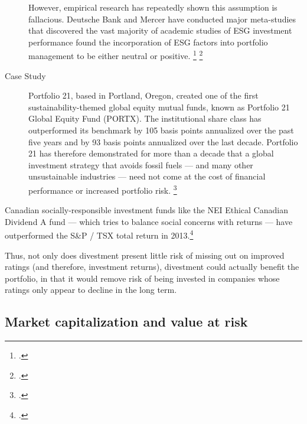 \begin{description}
  However, empirical research has repeatedly shown this assumption is fallacious.
  Deutsche Bank and Mercer have conducted major meta-studies that discovered the vast majority of academic studies of ESG investment performance found the incorporation of ESG factors into portfolio management to be either neutral or positive. \footcite{DeutscheBankSI} \footcite{MercerRI}
  \item[Case Study] Portfolio 21, based in Portland, Oregon, created one of the first sustainability-themed global equity mutual funds, known as Portfolio 21 Global Equity Fund (PORTX). The institutional share class has outperformed its benchmark by 105 basis points annualized over the past five years and by 93 basis points annualized over the last decade. Portfolio 21 has therefore demonstrated for more than a decade that a global investment strategy that avoids fossil fuels --- and many other unsustainable industries --- need not come at the cost of financial performance or increased portfolio risk. \footcite{FossilFreeInvesting}
\end{description}
Canadian socially-responsible investment funds like the NEI Ethical Canadian Dividend A fund --- which tries to balance social concerns with returns --- have outperformed the S\&P / TSX total return in 2013.\footcite[][]{HoldTheirOwn}



Thus, not only does divestment present little risk of missing out on improved ratings (and therefore, investment returns), divestment could actually benefit the portfolio, in that it would remove risk of being invested in companies whose ratings only appear to decline in the long term.



	\subsection {Market capitalization and value at risk}



